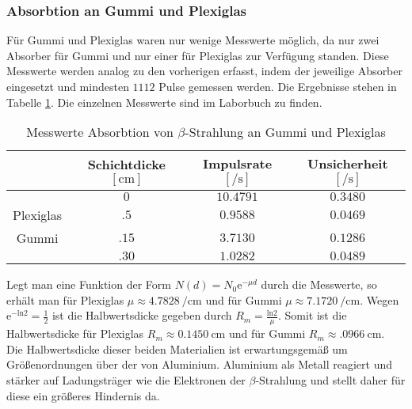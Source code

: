 \subsubsection{Absorbtion an Gummi und Plexiglas}
Für Gummi und Plexiglas waren nur wenige Messwerte möglich, da nur zwei Absorber für Gummi und nur einer für Plexiglas zur Verfügung standen. Diese Messwerte werden analog zu den vorherigen erfasst, indem der jeweilige Absorber eingesetzt und mindesten $ 1112 $ Pulse gemessen werden.
Die Ergebnisse stehen in Tabelle \ref{tab:abs_gum}. Die einzelnen Messwerte sind im Laborbuch zu finden.\\
\begin{table}[h!]
\centering
\begin{tabular}{c|c|c|c}
& Schichtdicke $ [\si{\centi\meter}] $ & Impulsrate $ [\si{\per\second}] $ & Unsicherheit $ [\si{\per\second}] $ \\\hline
& $ 0 $ & $ \num{10.4791} $ & $ \num{0.3480} $ \\ 
Plexiglas &  $ \num{.5} $ & $ \num{0.9588} $ & $ \num{0.0469} $ \\
Gummi & $ \num{.15} $ & $ \num{3.7130} $ & $ \num{0.1286} $ \\
	  &	$ \num{.30} $ & $ \num{1.0282} $ & $ \num{0.0489} $
\end{tabular}
\caption{Messwerte Absorbtion von $ \beta $-Strahlung an Gummi und Plexiglas}
\label{tab:abs_gum}
\end{table}
Legt man eine Funktion der Form $ N(d) = N_0 \mathrm{e}^{-\mu d} $ durch die Messwerte, so erhält man für Plexiglas $ \mu \approx \SI{4.7828}{\per\centi\meter} $ und für Gummi $ \mu \approx \SI{7.1720}{\per\centi\meter} $. Wegen $ \mathrm{e}^{-\mathrm{ln} 2} = \frac{1}{2} $ ist die Halbwertsdicke gegeben durch $ R_m = \frac{\mathrm{ln}2}{\mu} $. Somit ist die Halbwertsdicke für Plexiglas $ R_m \approx \SI{0.1450}{\centi\meter} $ und für Gummi $ R_m \approx \SI{.0966}{\centi\meter} $.\\
Die Halbwertsdicke dieser beiden Materialien ist erwartungsgemäß um Größenordnungen über der von Aluminium. Aluminium als Metall reagiert und stärker auf Ladungsträger wie die Elektronen der $ \beta $-Strahlung und stellt daher für diese ein größeres Hindernis da.

